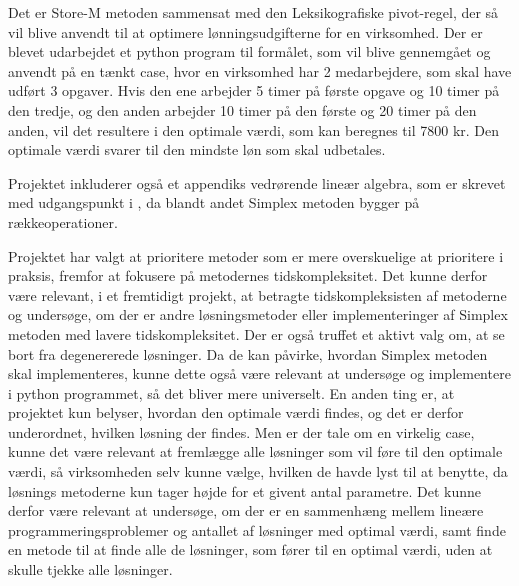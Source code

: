 Det er Store-M metoden sammensat med den Leksikografiske pivot-regel, der så vil blive anvendt til at optimere lønningsudgifterne for en virksomhed. Der er blevet udarbejdet et python program til formålet, som vil blive gennemgået og anvendt på en tænkt case, hvor en virksomhed har 2 medarbejdere, som skal have udført 3 opgaver. 
Hvis den ene arbejder 5 timer på første opgave og 10 timer på den tredje, og den anden arbejder 10 timer på den første og 20 timer på den anden, vil det resultere i den optimale værdi, som kan beregnes til 7800 kr. Den optimale værdi svarer til den mindste løn som skal udbetales.

Projektet inkluderer også et appendiks vedrørende lineær algebra, som er skrevet med udgangspunkt i \citep{lial}, da blandt andet Simplex metoden bygger på rækkeoperationer. 


Projektet har valgt at prioritere metoder som er mere overskuelige at prioritere i praksis, fremfor at fokusere på metodernes tidskompleksitet.
Det kunne derfor være relevant, i et fremtidigt projekt, at betragte tidskompleksisten af metoderne og undersøge, om der er andre løsningsmetoder eller implementeringer af Simplex metoden med lavere tidskompleksitet.
Der er også truffet et aktivt valg om, at se bort fra degenererede løsninger.
Da de kan påvirke, hvordan Simplex metoden skal implementeres, kunne dette også være relevant at undersøge og implementere i python programmet, så det bliver mere universelt.
En anden ting er, at projektet kun belyser, hvordan den optimale værdi findes, og det er derfor underordnet, hvilken løsning der findes. 
Men er der tale om en virkelig case, kunne det være relevant at fremlægge alle løsninger som vil føre til den optimale værdi, så virksomheden selv kunne vælge, hvilken de havde lyst til at benytte, da løsnings metoderne kun tager højde for et givent antal parametre.
Det kunne derfor være relevant at undersøge, om der er en sammenhæng mellem lineære programmeringsproblemer og antallet af løsninger med optimal værdi, samt finde en metode til at finde alle de løsninger, som fører til en optimal værdi, uden at skulle tjekke alle løsninger.